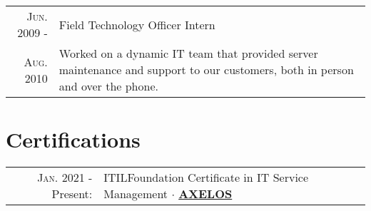\documentclass[letterpaper,10pt]{article}
\begin{document}
\begin{tabular}{R|p{6.2in}}
	\textsc{Jun.} 2009 -           & Field Technology Officer Intern                                                                                                                                                                                                                                                                                                                                                                                                                                                                                                                                                                                                                                                                                                                                                                                                                                                                                                                                                                                                                                                                                                                                                                                                                   \\
	\textsc{Aug.} 2010\phantom{ -} & \footnotesize Worked on a dynamic IT team that provided server maintenance and support to our customers, both in person and over the phone.
\end{tabular}

\section{Certifications}
\begin{tabular}{rl}
	\textsc{Jan.} 2021 - Present: & \textsc{ITIL}\textsuperscript{\circledR}\phantom{ }Foundation Certificate in IT Service Management $\cdot$ \href{https://www.axelos.com/successful-candidates-register}{\textbf{AXELOS}} \\
\end{tabular}

\end{document}
